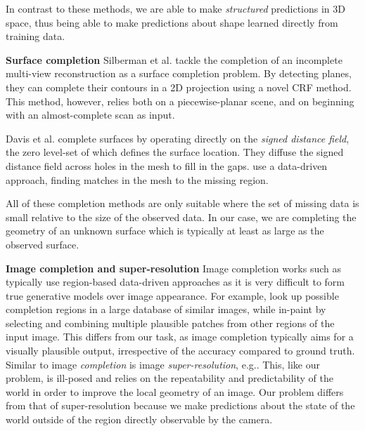 \documentclass[10pt,twocolumn,letterpaper]{article}
\makeatletter
\renewcommand*{\eg}{e.g.\@\xspace}
\newcommand*{\ea}{et al.\@\xspace}
\renewcommand{\paragraph}{\vspace{2pt}\noindent\textbf}
\makeatother
\begin{document}
In contrast to these methods, we are able to make \emph{structured} predictions in 3D space, thus being able to make predictions about shape learned directly from training data.


\paragraph{Surface completion}
Silberman \ea \cite{silberman-eccv-2014} tackle the completion of an incomplete multi-view reconstruction as a surface completion problem.
By detecting planes, they can complete their contours in a 2D projection using a novel CRF method.
This method, however, relies both on a piecewise-planar scene, and on beginning with an almost-complete scan as input.

Davis \ea \cite{davis-3dpvt-2002} complete surfaces by operating directly on the \emph{signed distance field}, the zero level-set of which defines the surface location. They diffuse the signed distance field across holes in the mesh to fill in the gaps.
\cite{harary-tog-2013} use a data-driven approach, finding matches in the mesh to the missing region.

All of these completion methods are only suitable where the set of missing data is small relative to the size of the observed data.
In our case, we are completing the geometry of an unknown surface which is typically at least as large as the observed surface.


\paragraph{Image completion and super-resolution}
Image completion works such as \cite{hays-siggraph-2007, criminisi-cvpr-2003}
typically use region-based data-driven approaches as it is very difficult to form true generative models over image appearance.
For example, \cite{hays-siggraph-2007} look up possible completion regions in a large database of similar images, while \cite{criminisi-cvpr-2003} in-paint by selecting and combining multiple plausible patches from other regions of the input image.
This differs from our task, as image completion typically aims for a visually plausible output, irrespective of the accuracy compared to ground truth.
Similar to image \emph{completion} is image \emph{super-resolution}, \eg \cite{macaodha-eccv-2012}.
This, like our problem, is ill-posed and relies on the repeatability and predictability of the world in order to improve the local geometry of an image.
Our problem differs from that of super-resolution because we make predictions about the state of the world outside of the region directly observable by the camera.
\end{document}
